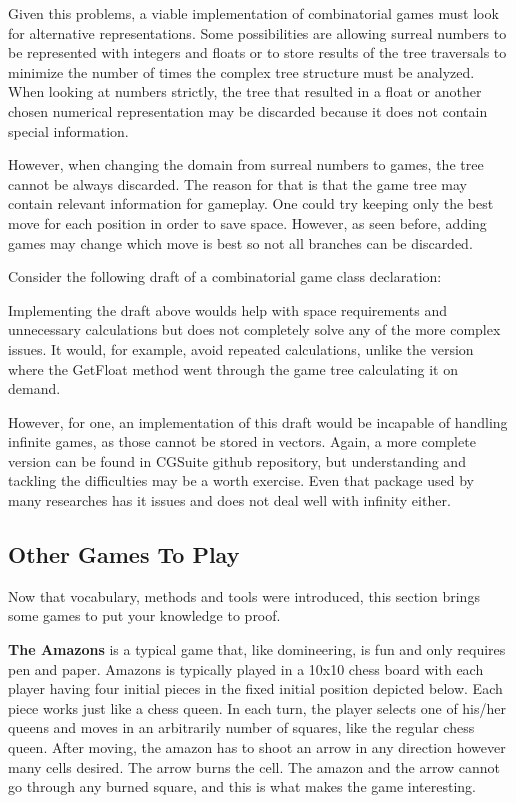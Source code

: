 

Given this problems, a viable implementation of combinatorial games must look for alternative representations. Some possibilities are allowing surreal numbers to be represented with integers and floats or to store results of the tree traversals to minimize the number of times the complex tree structure must be analyzed. When looking at numbers strictly, the tree that resulted in a float or another chosen numerical representation may be discarded because it does not contain special information.

However, when changing the domain from surreal numbers to games, the tree cannot be always discarded. The reason for that is that the game tree may contain relevant information for gameplay. One could try keeping only the best move for each position in order to save space. However, as seen before, adding games may change which move is best so not all branches can be discarded.

Consider the following draft of a combinatorial game class declaration:



Implementing the draft above woulds help with space requirements and unnecessary calculations but does not completely solve any of the more complex issues. It would, for example, avoid repeated calculations, unlike the version where the GetFloat method went through the game tree calculating it on demand.

However, for one, an implementation of this draft would be incapable of handling infinite games, as those cannot be stored in vectors. Again, a more complete version can be found in CGSuite github repository, but understanding and tackling the difficulties may be a worth exercise. Even that package used by many researches has it issues and does not deal well with infinity either.

\subsection*{Other Games To Play}

Now that vocabulary, methods and tools were introduced, this section brings some games to put your knowledge to proof.

\textbf{The Amazons} is a typical game that, like domineering, is fun and only requires pen and paper. Amazons is typically played in a 10x10 chess board with each player having four initial pieces in the fixed initial position depicted below. Each piece works just like a chess queen. In each turn, the player selects one of his/her queens and moves in an arbitrarily number of squares, like the regular chess queen. After moving, the amazon has to shoot an arrow in any direction however many cells desired. The arrow burns the cell. The amazon and the arrow cannot go through any burned square, and this is what makes the game interesting.

